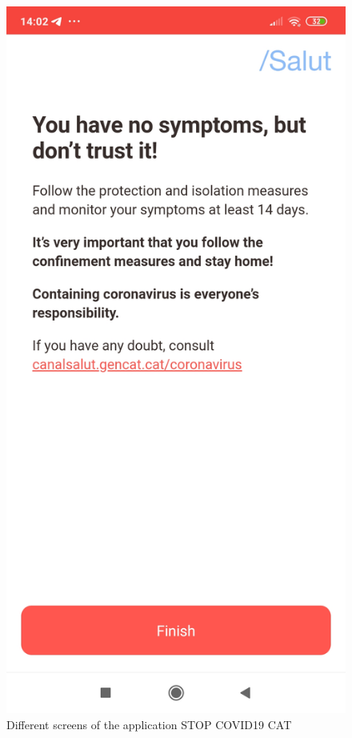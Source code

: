 \documentclass[a4paper, 12pt]{article}
\begin{document}
\begin{figure}[!htb]
\begin{minipage}{0.33\textwidth}
   \end{minipage}
   \begin{minipage}{0.33\textwidth}
     \centering
     \includegraphics[scale=0.06]{images/discussion/covid-cat-3.jpg}
   \end{minipage}
   \caption{Different screens of the application STOP COVID19 CAT}
   \label{fig:covid-cat}
\end{figure}
\end{document}
